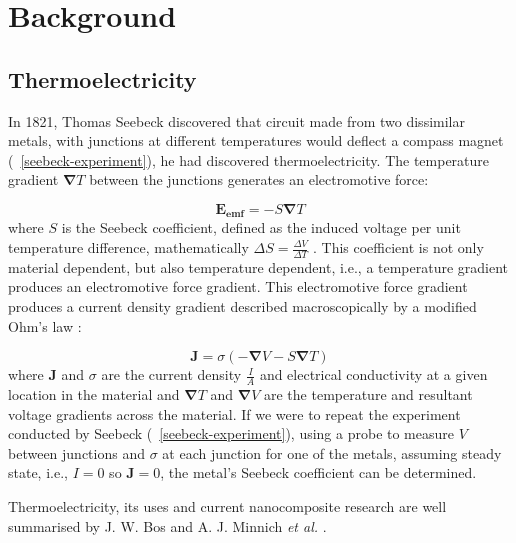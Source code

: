 \documentclass[12pt,titlepage,draft]{article}
\newcommand{\figref}[2][\figurename~]{#1\ref{#2}}
\renewcommand{\vec}[1]{\mathbf{#1}}
\begin{document}
\section{Background}
\subsection{Thermoelectricity}
In 1821, Thomas Seebeck discovered that circuit made from two dissimilar metals, with junctions at different temperatures would deflect a compass magnet (\figref{seebeck-experiment}), he had discovered thermoelectricity. The temperature gradient $\vec{\nabla} T$ between the junctions generates an electromotive force:

\begin{equation}
\label{seebeck-emf}
	\vec{E_{emf}} = -S \vec{\nabla} T
\end{equation}
where $S$ is the Seebeck coefficient, defined as the induced voltage per unit temperature difference, mathematically $\Delta S = \frac{\Delta V}{\Delta T}$ \cite{auparay}. This coefficient is not only material dependent, but also temperature dependent, i.e., a temperature gradient produces an electromotive force gradient. This electromotive force gradient produces a current density gradient described macroscopically by a modified Ohm's law \cite{ziman}:

\begin{equation}
\label{current-density}
	\vec{J} = \sigma (-\vec{\nabla} V - S \vec{\nabla} T)
\end{equation}
where $\vec{J}$ and $\sigma$ are the current density $\frac{I}{A}$ and electrical conductivity at a given location in the material and $\vec{\nabla} T$ and $\vec{\nabla} V$ are the temperature and resultant voltage gradients across the material. If we were to repeat the experiment conducted by Seebeck (\figref{seebeck-experiment}), using a probe to measure $V$ between junctions and $\sigma$ at each junction for one of the metals, assuming steady state, i.e., $I=0$ so $\vec{J} = 0$, the metal's Seebeck coefficient can be determined.

Thermoelectricity, its uses and current nanocomposite research are well summarised by J. W. Bos \cite{bos-review} and A. J. Minnich \emph{et al.} \cite{minnich-review}.
\end{document}
